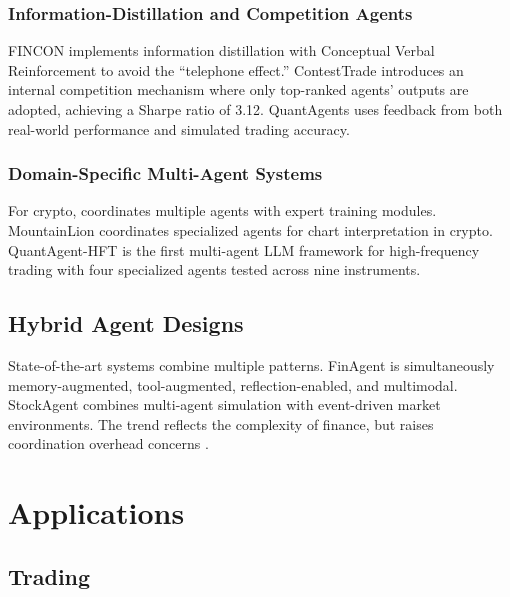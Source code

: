 \documentclass[12pt]{report}
\begin{document}
\subsection{Information-Distillation and Competition Agents}

FINCON \citep{yu2024fincon} implements information distillation with Conceptual Verbal Reinforcement to avoid the ``telephone effect.'' ContestTrade \citep{zhao2025contesttrade} introduces an internal competition mechanism where only top-ranked agents' outputs are adopted, achieving a Sharpe ratio of 3.12. QuantAgents \citep{li2025quantagents} uses feedback from both real-world performance and simulated trading accuracy.

\subsection{Domain-Specific Multi-Agent Systems}

For crypto, \citet{luo2025cryptoportfolio} coordinates multiple agents with expert training modules. MountainLion \citep{wu2025mountainlion} coordinates specialized agents for chart interpretation in crypto. QuantAgent-HFT \citep{xiong2025quantagenthft} is the first multi-agent LLM framework for high-frequency trading with four specialized agents tested across nine instruments.

\section{Hybrid Agent Designs}

State-of-the-art systems combine multiple patterns. FinAgent \citep{zhang2024finagent} is simultaneously memory-augmented, tool-augmented, reflection-enabled, and multimodal. StockAgent \citep{zhang2024stockagent} combines multi-agent simulation with event-driven market environments. The trend reflects the complexity of finance, but raises coordination overhead concerns \citep{li2025canllmoutperform}.


\chapter{Applications}

\section{Trading}
\end{document}
